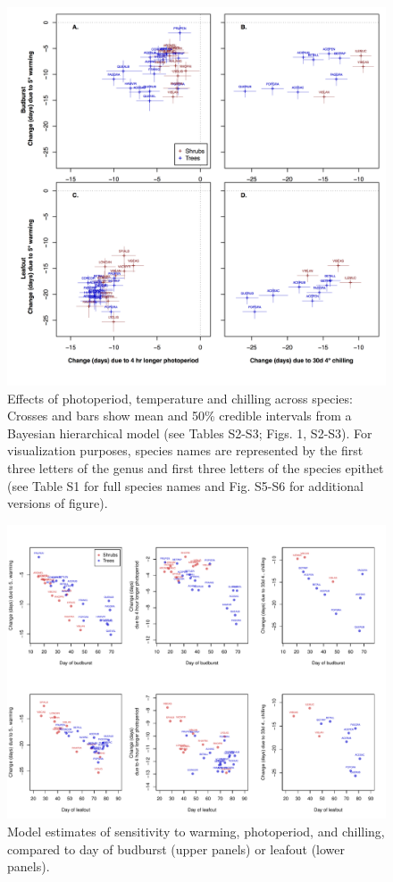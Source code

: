 \documentclass[11pt]{article}
\begin{document}
\newpage
\begin{figure}[h!]
\centering
\noindent \includegraphics[width=1\textwidth]{images/Fig2_4panel.png}
\caption{Effects of photoperiod, temperature and chilling across species: Crosses and bars show mean and 50\% credible intervals from a Bayesian hierarchical model (see Tables S2-S3; Figs. 1, S2-S3). For visualization purposes, species names are represented by the first three letters of the genus and first three letters of the species epithet (see Table S1 for full species names and Fig. S5-S6 for additional versions of figure).}
\label{fig:sppeff}
\end{figure}

\newpage
\begin{figure}
\includegraphics[width=1\textwidth]{Sens_vs_day_treeshrub}
\caption{Model estimates of sensitivity to warming, photoperiod, and chilling, compared to day of budburst (upper panels) or leafout (lower panels).}
\label{fig:commsens}
\end{figure}
\end{document}
